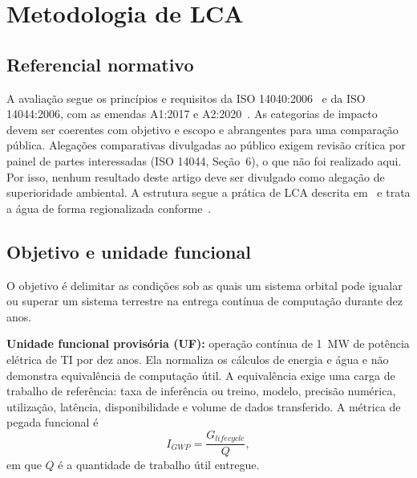 \documentclass[11pt,a4paper]{article}
\begin{document}
\section{Metodologia de LCA}

\subsection{Referencial normativo}\label{sec:norma}

A avaliação segue os princípios e requisitos da ISO 14040:2006~\cite{r1} e da
ISO 14044:2006, com as emendas A1:2017 e A2:2020~\cite{r2}. As categorias de
impacto devem ser coerentes com objetivo e escopo e abrangentes para uma
comparação pública. Alegações comparativas divulgadas ao público exigem revisão
crítica por painel de partes interessadas (ISO 14044, Seção~6), o que não foi
realizado aqui. Por isso, nenhum resultado deste artigo deve ser divulgado como
alegação de superioridade ambiental. A estrutura segue a prática de LCA
descrita em~\cite{r37} e trata a água de forma regionalizada
conforme~\cite{r38,r39}.

\subsection{Objetivo e unidade funcional}

O objetivo é delimitar as condições sob as quais um sistema orbital pode
igualar ou superar um sistema terrestre na entrega contínua de computação
durante dez anos.

\textbf{Unidade funcional provisória (UF):} operação contínua de 1~MW de
potência elétrica de TI por dez anos. Ela normaliza os cálculos de energia e
água e não demonstra equivalência de computação útil. A equivalência exige uma
carga de trabalho de referência: taxa de inferência ou treino, modelo,
precisão numérica, utilização, latência, disponibilidade e volume de dados
transferido. A métrica de pegada funcional é
\begin{equation}
  I_{GWP}=\frac{G_{lifecycle}}{Q},
  \label{eq:igwp}
\end{equation}
em que $Q$ é a quantidade de trabalho útil entregue.
\end{document}
